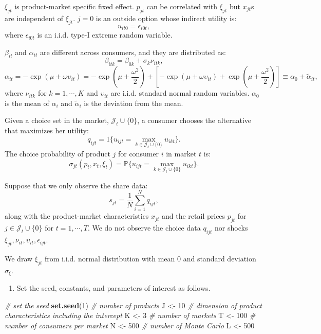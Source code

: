 \documentclass[
]{book}
\newenvironment{Shaded}{\begin{snugshade}}{\end{snugshade}}
\newcommand{\CommentTok}[1]{\textcolor[rgb]{0.56,0.35,0.01}{\textit{#1}}}
\newcommand{\DecValTok}[1]{\textcolor[rgb]{0.00,0.00,0.81}{#1}}
\newcommand{\FunctionTok}[1]{\textcolor[rgb]{0.13,0.29,0.53}{\textbf{#1}}}
\newcommand{\NormalTok}[1]{#1}
\newcommand{\OtherTok}[1]{\textcolor[rgb]{0.56,0.35,0.01}{#1}}
\providecommand{\tightlist}{%
  \setlength{\itemsep}{0pt}\setlength{\parskip}{0pt}}
\begin{document}
\(\xi_{jt}\) is product-market specific fixed effect. \(p_{jt}\) can be correlated with \(\xi_{jt}\) but \(x_{jt}\)s are independent of \(\xi_{jt}\). \(j = 0\) is an outside option whose indirect utility is:
\[
u_{it0} = \epsilon_{i0t},
\]
where \(\epsilon_{i0t}\) is an i.i.d. type-I extreme random variable.

\(\beta_{it}\) and \(\alpha_{it}\) are different across consumers, and they are distributed as:
\[
\beta_{itk} = \beta_{0k} + \sigma_k \nu_{itk},
\]
\[
\alpha_{it} = - \exp(\mu + \omega \upsilon_{it}) = - \exp(\mu + \frac{\omega^2}{2}) + [- \exp(\mu + \omega \upsilon_{it}) + \exp(\mu + \frac{\omega^2}{2})] \equiv \alpha_0 + \tilde{\alpha}_{it},
\]
where \(\nu_{itk}\) for \(k = 1, \cdots, K\) and \(\upsilon_{it}\) are i.i.d. standard normal random variables. \(\alpha_0\) is the mean of \(\alpha_i\) and \(\tilde{\alpha}_i\) is the deviation from the mean.

Given a choice set in the market, \(\mathcal{J}_t \cup \{0\}\), a consumer chooses the alternative that maximizes her utility:
\[
q_{ijt} = 1\{u_{ijt} = \max_{k \in \mathcal{J}_t \cup \{0\}} u_{ikt}\}.
\]
The choice probability of product \(j\) for consumer \(i\) in market \(t\) is:
\[
\sigma_{jt}(p_t, x_t, \xi_t) = \mathbb{P}\{u_{ijt} = \max_{k \in \mathcal{J}_t \cup \{0\}} u_{ikt}\}.
\]

Suppose that we only observe the share data:
\[
s_{jt} = \frac{1}{N} \sum_{i = 1}^N q_{ijt},
\]
along with the product-market characteristics \(x_{jt}\) and the retail prices \(p_{jt}\) for \(j \in \mathcal{J}_t \cup \{0\}\) for \(t = 1, \cdots, T\). We do not observe the choice data \(q_{ijt}\) nor shocks \(\xi_{jt}, \nu_{it}, \upsilon_{it}, \epsilon_{ijt}\).

We draw \(\xi_{jt}\) from i.i.d. normal distribution with mean 0 and standard deviation \(\sigma_{\xi}\).

\begin{enumerate}
\def\labelenumi{\arabic{enumi}.}
\tightlist
\item
  Set the seed, constants, and parameters of interest as follows.
\end{enumerate}

\begin{Shaded}
\begin{Highlighting}[]
\CommentTok{\# set the seed}
\FunctionTok{set.seed}\NormalTok{(}\DecValTok{1}\NormalTok{)}
\CommentTok{\# number of products}
\NormalTok{J }\OtherTok{\textless{}{-}} \DecValTok{10}
\CommentTok{\# dimension of product characteristics including the intercept}
\NormalTok{K }\OtherTok{\textless{}{-}} \DecValTok{3}
\CommentTok{\# number of markets}
\NormalTok{T }\OtherTok{\textless{}{-}} \DecValTok{100}
\CommentTok{\# number of consumers per market}
\NormalTok{N }\OtherTok{\textless{}{-}} \DecValTok{500}
\CommentTok{\# number of Monte Carlo}
\NormalTok{L }\OtherTok{\textless{}{-}} \DecValTok{500}
\end{Highlighting}
\end{Shaded}
\end{document}
